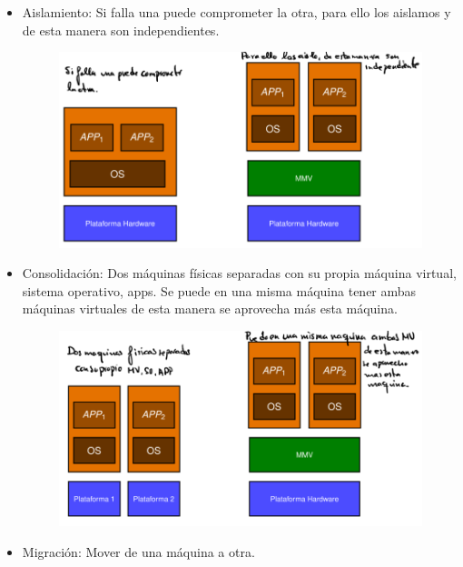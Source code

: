 \documentclass[12pt, twoside, openright]{report} %
\begin{document}
    \begin{itemize}
    \item
      Aislamiento: Si falla una puede comprometer la otra, para ello los
      aislamos y de esta manera son independientes.
      \begin{figure}[H]
        {\includegraphics[scale=.3]{Untitled 33.png}}
      \end{figure}
    \item
      Consolidación: Dos máquinas físicas separadas con su propia
      máquina virtual, sistema operativo, apps. Se puede en una misma
      máquina tener ambas máquinas virtuales de esta manera se aprovecha
      más esta máquina.
      \begin{figure}[H]
        {\includegraphics[scale=.3]{Untitled 34.png}}
      \end{figure}
    \item
      Migración: Mover de una máquina a otra.
      \begin{figure}[H]

\end{figure}
\end{itemize}
\end{document}
